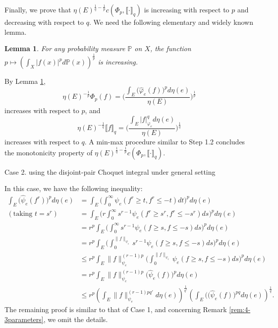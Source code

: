 \documentclass[12pt,a4paper]{article}
\newtheorem{lemma}[theorem]{Lemma}
\begin{document}
Finally, we prove that  $\eta(E)^{\frac1q-\frac1p}c(\Phi_p,\llbracket \cdot\rrbracket_{q})$  is increasing with respect to $p$ and decreasing with respect to $q$. 
We need the following elementary and widely known lemma. 

\begin{lemma}\label{lem:increase-mean-power}
%
For any probability measure $\mathbb{P}$ on $X$, the function $p\mapsto (\int_X |f(x)|^pd\mathbb{P}(x))^{\frac1p}$ is increasing. 
\end{lemma}

By Lemma \ref{lem:increase-mean-power}, $$\eta(E)^{-\frac1p}\Phi_p(f)=\Big(\frac{\int_E \big(\widehat{\varphi}_e(f)\big)^pd\eta(e)}{\eta(E)}\Big)^{\frac1p}$$
increases with respect to $p$, and 
$$\eta(E)^{-\frac1q}\big\llbracket f \big\rrbracket_q =\Big(\frac{\int_E|f|_{\varphi_e}^qd\eta(e)}{\eta(E)}\Big)^{\frac1q}$$
increases with respect to $q$. 
A min-max procedure similar to Step 1.2 concludes the monotonicity property of $\eta(E)^{\frac1q-\frac1p}c(\Phi_p,\llbracket \cdot\rrbracket_{q})$. 

\vspace{0.2cm}

\noindent Case 2. using the disjoint-pair  Choquet integral under general setting  

In this case, we have the following inequality:
\begin{align*}
\int_E\big(\widehat{\psi}_e(f^r)\big)^pd\eta(e)&=\int_E\Big(\int_0^\infty \psi_e(f^r\ge t,f^r\le -t)dt\Big)^pd\eta(e)
\\(\text{taking }t=s^r)&=\int_E\Big(r\int_0^\infty s^{r-1}\psi_e(f^r\ge s^r,f^r\le -s^r)ds\Big)^pd\eta(e) \\&=r^p\int_E\Big(\int_0^\infty s^{r-1}\psi_e(f\ge s,f\le -s)ds\Big)^pd\eta(e) 
\\&=r^p\int_E\Big(\int_0^{\|f\|_{\psi_e}} s^{r-1}\psi_e(f\ge s,f\le -s)ds\Big)^pd\eta(e)  
\\&\le r^p\int_E\|f\|_{\psi_e}^{(r-1)p}\Big(\int_0^{\|f\|_{\psi_e}} \psi_e(f\ge s,f\le -s)ds\Big)^pd\eta(e)
\\&= r^p\int_E\|f\|_{\psi_e}^{(r-1)p}\big(\widehat{\psi}_e(f)\big)^pd\eta(e)
\\&\le r^p\left(\int_E\|f\|_{\psi_e}^{(r-1)pq'}d\eta(e)\right)^{\frac{1}{q'}}\left(\int_E\big((\widehat{\psi}_e(f)\big)^{pq}d\eta(e)\right)^{\frac{1}{q}}.
\end{align*}
The remaining proof is similar to that of Case 1, and concerning Remark \ref{rem:4-3parameters}, we omit the details. 
\end{document}
